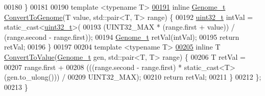 \begin{DoxyCode}
00180   \}
00181 
00190   \textcolor{keyword}{template} <\textcolor{keyword}{typename} T>
\hypertarget{_g_a_8h_source_l00191}{}\hyperlink{class_soil_math_1_1_g_a_a360250150f348af461259baf41477899}{00191}   \textcolor{keyword}{inline} \hyperlink{_soil_math_types_8h_a58f6ab36d2cb0527a73caec36d14a0e0}{Genome\_t} \hyperlink{class_soil_math_1_1_g_a_a360250150f348af461259baf41477899}{ConvertToGenome}(T value, std::pair<T, T> range) \{
00192     \hyperlink{_soil_math_types_8h_a435d1572bf3f880d55459d9805097f62}{uint32\_t} intVal = \textcolor{keyword}{static\_cast<}\hyperlink{_soil_math_types_8h_a435d1572bf3f880d55459d9805097f62}{uint32\_t}\textcolor{keyword}{>}(
00193         (UINT32\_MAX * (range.first + value)) / (range.second - range.first));
00194     \hyperlink{_soil_math_types_8h_a58f6ab36d2cb0527a73caec36d14a0e0}{Genome\_t} retVal(intVal);
00195     \textcolor{keywordflow}{return} retVal;
00196   \}
00197 
00204   \textcolor{keyword}{template} <\textcolor{keyword}{typename} T>
\hypertarget{_g_a_8h_source_l00205}{}\hyperlink{class_soil_math_1_1_g_a_aa4a6f59bd2e88d432a94d0159b8e8914}{00205}   \textcolor{keyword}{inline} T \hyperlink{class_soil_math_1_1_g_a_aa4a6f59bd2e88d432a94d0159b8e8914}{ConvertToValue}(\hyperlink{_soil_math_types_8h_a58f6ab36d2cb0527a73caec36d14a0e0}{Genome\_t} gen, std::pair<T, T> range) \{
00206     T retVal =
00207         range.first +
00208         (((range.second - range.first) * static\_cast<T>(gen.to\_ulong())) /
00209          UINT32\_MAX);
00210     \textcolor{keywordflow}{return} retVal;
00211   \}
00212 \};
00213 \}
\end{DoxyCode}
